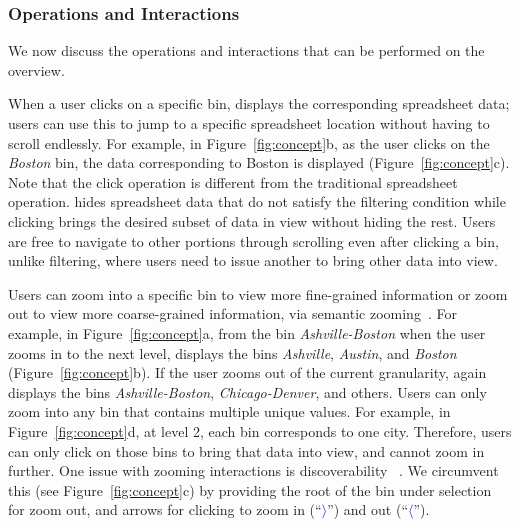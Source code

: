 \subsubsection{Operations and Interactions}
\label{sec:overview_operations}
We now discuss the operations and interactions that can be performed on the overview.

When a user clicks on a specific bin,
\noah displays the corresponding spreadsheet data;
users can use this to jump to a specific spreadsheet location
without having to scroll endlessly.
For example, in Figure~\ref{fig:concept}b,
as the user clicks on the \emph{Boston} bin,
the data corresponding to Boston is displayed
(Figure~\ref{fig:concept}c).
Note that the click operation is different from the traditional
spreadsheet  operation.
 hides spreadsheet data
that do not satisfy the filtering condition while
clicking brings the desired subset of data
in view without hiding the rest.
Users are free to navigate to other portions
through scrolling
even after clicking a bin, unlike filtering,
where users need to issue another 
to bring other data into view.


Users can zoom into a specific bin
to view more fine-grained information or zoom out
to view more coarse-grained information,
via semantic zooming~\cite{perlin1993pad}.
For example, in Figure~\ref{fig:concept}a,
from the bin \emph{Ashville-Boston}
when the user zooms in to the next level,
\noah displays the bins \emph{Ashville}, \emph{Austin},
and \emph{Boston} (Figure~\ref{fig:concept}b).
If the user zooms out of the current granularity, again \noah displays the bins \emph{Ashville-Boston}, \emph{Chicago-Denver}, and others.
Users can only zoom into any bin that
contains multiple unique values.
For example, in Figure~\ref{fig:concept}d, at level 2,
each bin corresponds to one city.
Therefore, users can only click on those bins
to bring that data into view, and cannot zoom in further.
One issue with zooming interactions
is discoverability ~\cite{cockburn2009review}.
We circumvent this (see Figure~\ref{fig:concept}c)
by providing the root of the bin under selection
for zoom out, and arrows for
clicking to zoom in (``\textcolor{blue}{$\rangle$}'') and out (``\textcolor{blue}{$\langle$}'').

